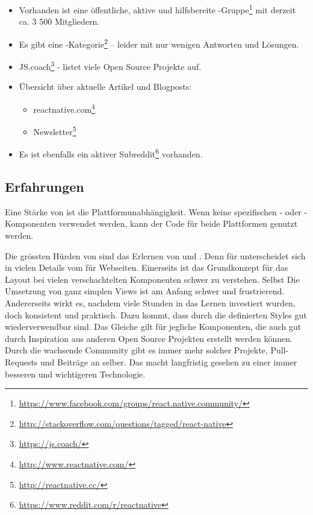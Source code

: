 \begin{itemize}
	\item Vorhanden ist eine öffentliche, aktive und hilfsbereite -Gruppe\footnote{\url{https://www.facebook.com/groups/react.native.community/}} mit derzeit ca. 3 500 Mitgliedern.
	\item Es gibt eine -Kategorie\footnote{\url{http://stackoverflow.com/questions/tagged/react-native}} -- leider mit nur wenigen Antworten und Lösungen.
	\item JS.coach\footnote{\url{https://js.coach/}} - listet viele Open Source Projekte auf.
	\item Übersicht über aktuelle Artikel und Blogposts: 
	\begin{itemize}
		\item reactnative.com\footnote{\url{http://www.reactnative.com/}}
		\item {} Newsletter\footnote{\url{http://reactnative.cc/}}
	\end{itemize}
	\item Es ist ebenfalls ein aktiver Subreddit\footnote{\url{https://www.reddit.com/r/reactnative}} vorhanden.
\end{itemize}


\subsection{Erfahrungen}
Eine Stärke von  ist die Plattformunabhängigkeit. 
Wenn keine spezifischen - oder -Komponenten verwendet werden, kann der Code für beide Plattformen genutzt werden.

Die grössten Hürden von  sind das Erlernen von  und . 
Denn  für  unterscheidet sich in vielen Details vom  für Webseiten. 
Einerseits ist das Grundkonzept für das Layout bei vielen verschachtelten Komponenten schwer zu verstehen. 
Selbst Die Umsetzung von ganz simplen Views ist am Anfang schwer und frustrierend. 
Andererseits wirkt es, nachdem viele Stunden in das Lernen investiert wurden, doch konsistent und praktisch. 
Dazu kommt, dass durch  die definierten Styles gut wiederverwendbar sind. 
Das Gleiche gilt für jegliche Komponenten, die auch gut durch Inspiration aus anderen Open Source Projekten erstellt werden können.
Durch die wachsende Community gibt es immer mehr solcher Projekte, Pull-Requests und Beiträge an  selber. 
Das macht  langfristig gesehen zu einer immer besseren und wichtigeren Technologie. 

